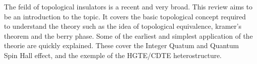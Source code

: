 The feild of topological insulators is a recent and very broad. This review aims to be an introduction to the topic. It covers the basic topological concept required to understand the theory such as the idea of topological equivalence, kramer's theorem and the berry phase. Some of the earliest and simplest application of the theorie  are quickly explained. These cover the Integer Quatum and Quantum Spin Hall effect, and the exemple of the HGTE/CDTE heterostructure.